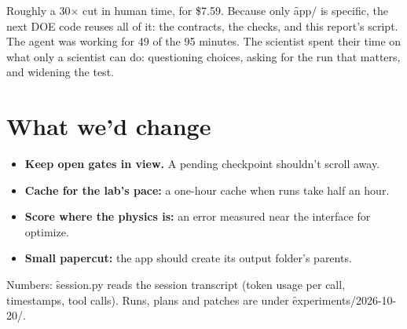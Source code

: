 \documentclass{../style}
\newcommand{\wall}{95}\newcommand{\human}{18}\newcommand{\agent}{49}\newcommand{\usd}{7.59}
\begin{document}
Roughly a 30$\times$ cut in human time, for \$\usd. Because only \f{app/} is specific, the
next DOE code reuses all of it: the contracts, the checks, and this report's script. The agent was working for \agent{} of the
\wall{} minutes. The scientist spent their time on what only a scientist can do: questioning
choices, asking for the run that matters, and widening the test.

\section{What we'd change}

\begin{itemize}
  \item \textbf{Keep open gates in view.} A pending checkpoint shouldn't scroll away.
  \item \textbf{Cache for the lab's pace:} a one-hour cache when runs take half an hour.
  \item \textbf{Score where the physics is:} an error measured near the interface for optimize.
  \item \textbf{Small papercut:} the app should create its output folder's parents.
\end{itemize}

{\small\color{muted}Numbers: \f{session.py} reads the session transcript (token usage per call,
timestamps, tool calls). Runs, plans and patches are under \f{experiments/2026-10-20/}.}
\end{document}
